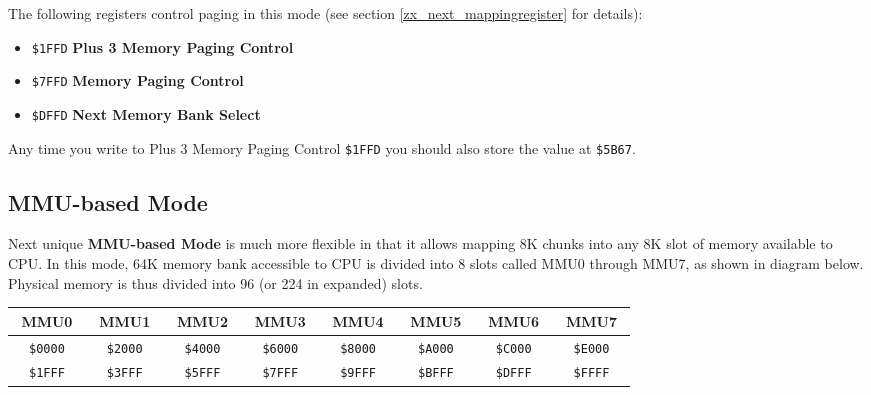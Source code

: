 \documentclass[12pt,twoside,openright,a4paper]{book}
\newcommand{\notet}{\rule{0pt}{2.4ex}}
\newcommand{\noteb}{\rule[-1.3ex]{0pt}{0pt}}
\begin{document}
The following registers control paging in this mode (see section \ref{zx_next_mappingregister} for details):

\begin{itemize}
	\item {\tt \$1FFD} \textbf{Plus 3 Memory Paging Control}
	\item {\tt \$7FFD} \textbf{Memory Paging Control}
	\item {\tt \$DFFD} \textbf{Next Memory Bank Select}
\end{itemize}

Any time you write to Plus 3 Memory Paging Control {\tt \$1FFD} you should also store the value at {\tt \$5B67}.

\pagebreak
\subsection{MMU-based Mode}
\label{zx_next_bank_mmu_mode}

Next unique \textbf{MMU-based Mode} is much more flexible in that it allows mapping 8K chunks into any 8K slot of memory available to CPU. In this mode, 64K memory bank accessible to CPU is divided into 8 slots called MMU0 through MMU7, as shown in diagram below. Physical memory is thus divided into 96 (or 224 in expanded) slots.

\begingroup
	\setlength{\tabcolsep}{1pt}
	\begin{tabular}{|cccc|cccc|cccc|cccc|cccc|cccc|cccc|cccc|}
		\hline
		\multicolumn{4}{|c}{MMU0}\notet\noteb & 
			\multicolumn{4}{|c}{MMU1} & 
			\multicolumn{4}{|c}{MMU2} & 
			\multicolumn{4}{|c}{MMU3} & 
			\multicolumn{4}{|c}{MMU4} & 
			\multicolumn{4}{|c}{MMU5} & 
			\multicolumn{4}{|c}{MMU6} & 
			\multicolumn{4}{|c|}{MMU7} \\
		\hline
		\colnoline{$\leftarrow$}\notet & \multicolumn{2}{c}{\tt \$0000} & \colnoline{} &
			\colnoline{$\leftarrow$}\notet & \multicolumn{2}{c}{\tt \$2000} & \colnoline{} &
			\colnoline{$\leftarrow$}\notet & \multicolumn{2}{c}{\tt \$4000} & \colnoline{} &
			\colnoline{$\leftarrow$}\notet & \multicolumn{2}{c}{\tt \$6000} & \colnoline{} &
			\colnoline{$\leftarrow$}\notet & \multicolumn{2}{c}{\tt \$8000} & \colnoline{} &
			\colnoline{$\leftarrow$}\notet & \multicolumn{2}{c}{\tt \$A000} & \colnoline{} &
			\colnoline{$\leftarrow$}\notet & \multicolumn{2}{c}{\tt \$C000} & \colnoline{} &
			\colnoline{$\leftarrow$}\notet & \multicolumn{2}{c}{\tt \$E000} & \colnoline{} \\
		\colnoline{} & \multicolumn{2}{c}{\tt \$1FFF} & \colnoline{$\rightarrow$} &
			\colnoline{} & \multicolumn{2}{c}{\tt \$3FFF} & \colnoline{$\rightarrow$} &
			\colnoline{} & \multicolumn{2}{c}{\tt \$5FFF} & \colnoline{$\rightarrow$} &
			\colnoline{} & \multicolumn{2}{c}{\tt \$7FFF} & \colnoline{$\rightarrow$} &
			\colnoline{} & \multicolumn{2}{c}{\tt \$9FFF} & \colnoline{$\rightarrow$} &
			\colnoline{} & \multicolumn{2}{c}{\tt \$BFFF} & \colnoline{$\rightarrow$} &
			\colnoline{} & \multicolumn{2}{c}{\tt \$DFFF} & \colnoline{$\rightarrow$} &
			\colnoline{} & \multicolumn{2}{c}{\tt \$FFFF} & \colnoline{$\rightarrow$} \\
	\end{tabular}
\endgroup
\end{document}
